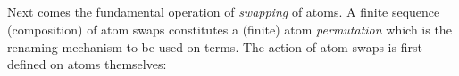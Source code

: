 \documentclass{entcs}
\begin{document}
\begin{code}%
\> \AgdaDatatype{\_\#\_} \AgdaSymbol{(} \AgdaSymbol{:} \AgdaSymbol{)} \AgdaSymbol{:} \<[23]%
\>[23]   \<%
\\
\>[0]\<[2]%
\>[2] \<[7]%
\>[7]\AgdaSymbol{:} \AgdaSymbol{\{} \AgdaSymbol{:} \AgdaSymbol{\}} \<[28]%
\>[28]    \<[45]%
\>[45]  \AgdaDatatype{\#}  \<%
\\
\>[0]\<[2]%
\>[2] \<[7]%
\>[7]\AgdaSymbol{:} \AgdaSymbol{\{}  \AgdaSymbol{:}  \AgdaSymbol{\}} \<[28]%
\>[28]  \AgdaDatatype{\#}    \AgdaDatatype{\#}  \<[45]%
\>[45]  \AgdaDatatype{\#}   \<%
\\
\>[0]\<[2]%
\>[2] \<[7]%
\>[7]\AgdaSymbol{:} \AgdaSymbol{\{} \AgdaSymbol{:} \AgdaSymbol{\}} \<[45]%
\>[45]  \AgdaDatatype{\#}   \<%
\\
\>[0]\<[2]%
\>[2] \<[7]%
\>[7]\AgdaSymbol{:} \AgdaSymbol{\{} \AgdaSymbol{:} \AgdaSymbol{\}\{} \AgdaSymbol{:} \AgdaSymbol{\}} \<[28]%
\>[28]  \AgdaDatatype{\#}  \<[45]%
\>[45]  \AgdaDatatype{\#}   \<%
\end{code}


Next comes the fundamental operation of \emph{swapping} of atoms. A finite sequence (composition) of atom swaps constitutes a (finite) atom \emph{permutation} which is the renaming mechanism to be used on terms.
The action of atom swaps is first defined on atoms themselves:

\end{document}
